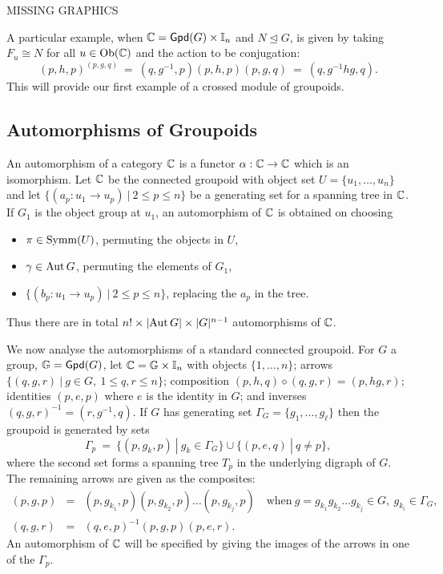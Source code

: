 \begin{center}
MISSING GRAPHICS
\end{center}

A particular example, when $\mathbb{C}={\sf Gpd}(G)\times\mathbb{I}_n$ and $N \unlhd G$, 
is given by taking $F_u \cong N$ for all $u \in \mathrm{Ob}(\mathbb{C})$ and the action 
to be conjugation:
\begin{equation} \label{eq:gpd-conj}
(p,h,p)^{(p,g,q)} ~=~ (q,g^{-1},p)(p,h,p)(p,g,q) ~=~ (q,g^{-1}hg,q). 
\end{equation}
This will provide our first example of a crossed module of groupoids. 



\newpage
\subsection{Automorphisms of Groupoids}

An automorphism of a category $\mathbb{C}$ is a functor $\alpha : \mathbb{C} \to \mathbb{C}$ 
which is an isomorphism. 
Let $\mathbb{C}$ be the connected groupoid with object set $U=\{u_1,\ldots,u_n\}$ 
and let $\{(a_p : u_1 \to u_p) ~|~ 2 \leqslant p \leqslant n\}$ 
be a generating set for a spanning tree in $\mathbb{C}$. 
If $G_1$ is the object group at $u_1$, 
an automorphism of $\mathbb{C}$ is obtained on choosing 
\begin{itemize}
\item
$\pi \in \mathrm{Symm}(U)$, permuting the objects in $U$, 
\item
$\gamma \in \mathrm{Aut}\,G$, permuting the elements of $G_1$, 
\item
$\{(b_p : u_1 \to u_p) ~|~ 2 \leqslant p \leqslant n\}$, 
replacing the $a_p$ in the tree. 
\end{itemize}
Thus there are in total $n! \times |\mathrm{Aut}\,G| \times |G|^{n-1}$ 
automorphisms of $\mathbb{C}$. 

\bigskip
We now analyse the automorphisms of a standard connected groupoid. 
For $G$ a group, $\mathbb{G} = {\sf Gpd}(G)$, 
let $\mathbb{C} = \mathbb{G} \times \mathbb{I}_n$ with objects $\{1,\ldots,n\}$; 
arrows $\{(q,g,r) ~|~ g \in G,~ 1 \leqslant q,r \leqslant n\}$; 
composition $(p,h,q)\diamond(q,g,r) = (p,hg,r)$; 
identities $(p,e,p)$ where $e$ is the identity in $G$; 
and inverses $(q,g,r)^{-1} = (r,g^{-1},q)$. 
If $G$ has generating set $\Gamma_G = \{g_1,\ldots,g_{\ell}\}$ 
then the groupoid is generated by sets  
$$
\Gamma_p ~=~ \{(p,g_k,p) ~|~ g_k \in \Gamma_G\} \cup 
             \{(p,e,q) ~|~ q \neq p\}, 
$$
where the second set forms a spanning tree $T_p$ in the underlying 
digraph of $G$. 
The remaining arrows are given as the composites: 
\begin{eqnarray*}
(p,g,p) &=& (p,g_{k_1},p)(p,g_{k_2},p)\ldots(p,g_{k_j},p) \quad\text{when}~ 
             g = g_{k_1}g_{k_2}\ldots g_{k_j} \in G,~ g_{k_i} \in \Gamma_G, \\
(q,g,r) &=& (q,e,p)^{-1}(p,g,p)(p,e,r).
\end{eqnarray*}
An automorphism of $\mathbb{C}$ will be specified by giving the images 
of the arrows in one of the $\Gamma_p$. 

